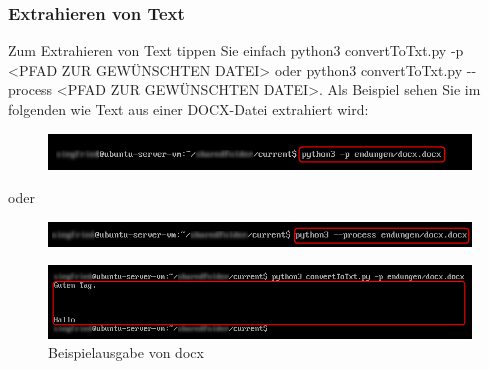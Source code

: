 \documentclass[12pt]{scrartcl}
\begin{document}
\subsubsection{Extrahieren von Text}
\label{sec:first-steps-extraction}
Zum Extrahieren von Text tippen Sie einfach	
python3 convertToTxt.py -p <PFAD ZUR GEWÜNSCHTEN DATEI> oder python3 convertToTxt.py -{}-process <PFAD ZUR GEWÜNSCHTEN DATEI>.
Als Beispiel sehen Sie im folgenden wie Text aus einer DOCX-Datei extrahiert wird:
\begin{figure}[htbp]
\includegraphics[width=1.0\textwidth]{ersteSchritteExtract001}\par\vspace{0.25cm}
\label{fig:ersteSchritteExtract001}
\end{figure}
\begin{center}
oder
\end{center}
\begin{figure}[htbp]
\includegraphics[width=1.0\textwidth]{ersteSchritteExtract002}\par\vspace{0.25cm}
\label{fig:ersteSchritteExtract002}
\end{figure}
\begin{figure}[htbp]
\includegraphics[width=1.0\textwidth]{ersteSchritteExtract003}\par\vspace{0.25cm}
\caption{Beispielausgabe von docx}
\label{fig:ersteSchritteExtract003}
\end{figure}
\newpage
\end{document}
